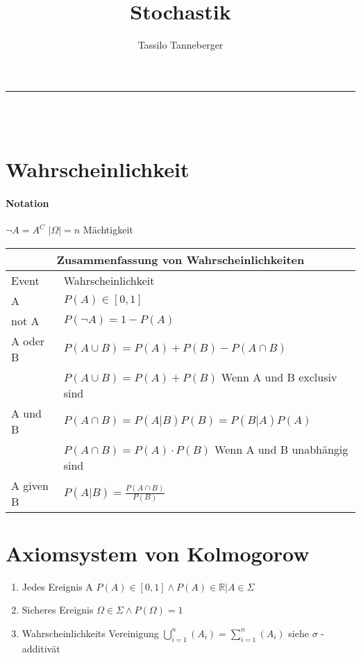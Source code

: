 \documentclass[12pt]{article}
\title{Stochastik}
\author{Tassilo Tanneberger}
\makeatletter
\newcommand{\linia}{\rule{\linewidth}{0.5pt}}
\renewcommand{\maketitle}{\begin{center}
\huge \@title\end{center}
\linia\\
{\large\@author\hfill\@date\\}}
\makeatother
\begin{document}
\maketitle

\section{Wahrscheinlichkeit}

\paragraph{Notation} \( \neg A = A^C \) \newline \( \vert \Omega \vert = n \) Mächtigkeit \newline

\begin{tabular}{ |p{5cm}|p{12cm}|  }
 \hline
 \multicolumn{2}{|c|}{Zusammenfassung von Wahrscheinlichkeiten} \\
 \hline
Event & Wahrscheinlichkeit\\
 \hline
 A & \( P(A) \in [0, 1] \) \\
 not A & \( P(\neg A) = 1 - P(A) \) \\
 A oder B & \( P(A \cup B) = P(A) + P(B) - P(A \cap B) \)  \\
  & \(  P(A \cup B) = P(A) + P(B) \) Wenn A und B exclusiv sind \\
 A und B & \( P(A \cap B) = P(A\vert B)P(B) = P(B\vert A)P(A)\) \\
 & \( P(A \cap B) = P(A) \cdot P(B) \) Wenn A und B unabhängig sind\\
  A given B & \( P(A \vert B) = \frac{P(A \cap B)}{P(B)}\) \\
 \hline
\end{tabular}

\section{ Axiomsystem von Kolmogorow}

\begin{enumerate}
	\item Jedes Ereignis A \( P(A) \in [0,1] \land P(A) \in \mathbb{R} \vert A \in \Sigma \) 
	\item Sicheres Ereignis \( \Omega \in \Sigma \land P(\Omega) = 1 \)
	\item Wahrscheinlichkeits Vereinigung \( \bigcup_{i=1}^{n} (A_i) = \sum_{i=1}^n (A_i)\) siehe \( \sigma \) - additivät
	
\end{enumerate}
\end{document}
